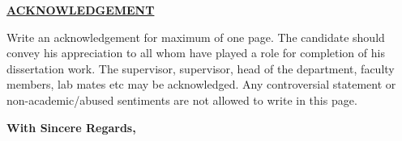 {\centering
	\par
	\large \textbf{\underline{ACKNOWLEDGEMENT}} \par
}\vspace{0.7cm}
Write an acknowledgement for maximum of one page. The candidate should convey his appreciation to all whom have played a role for completion of his dissertation work. The supervisor, supervisor, head of the department, faculty members, lab mates etc may be acknowledged. Any controversial statement or non-academic/abused sentiments are not allowed to write in this page.  

\vspace{1cm}
\begin{flushright}
	\textbf{With Sincere Regards,}\\
	\textbf{\StudentName}\\
	\textbf{\ProgramName}
\end{flushright}